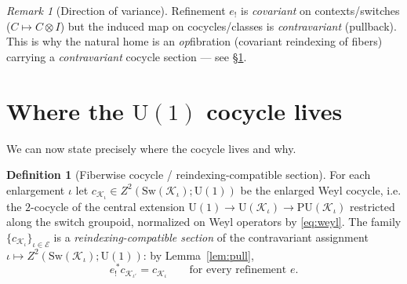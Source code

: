 \documentclass[11pt]{article}
\theoremstyle{definition}
\newtheorem{definition}{Definition}
\theoremstyle{remark}
\newtheorem*{remark}{Remark}
\newcommand{\K}{\mathcal K}
\newcommand{\Ecat}{\mathcal E}
\newcommand{\Sw}{\mathrm{Sw}}
\newcommand{\U}{\mathrm{U}}
\newcommand{\PU}{\mathrm{PU}}
\newcommand{\pushf}[1]{{#1}_{!}}
\begin{document}
\begin{remark}[Direction of variance]
Refinement $\pushf e$ is \emph{covariant} on contexts/switches ($C\mapsto C\otimes I$)
but the induced map on cocycles/classes is \emph{contravariant} (pullback). This is why
the natural home is an \emph{op}fibration (covariant reindexing of fibers) carrying a
\emph{contravariant} cocycle section --- see \S\ref{sec:cocycle}.
\end{remark}

\section{Where the \texorpdfstring{$\U(1)$}{U(1)} cocycle lives}\label{sec:cocycle}

We can now state precisely where the cocycle lives and why.

\begin{definition}[Fiberwise cocycle / reindexing-compatible section]\label{def:cocycle}
For each enlargement $\iota$ let $c_{\K_\iota}\in Z^2(\Sw(\K_\iota);\U(1))$ be the
enlarged Weyl cocycle, i.e. the $2$-cocycle of the central extension
$\U(1)\to\U(\K_\iota)\to\PU(\K_\iota)$ restricted along the switch groupoid, normalized
on Weyl operators by \eqref{eq:weyl}. The family
$\{c_{\K_\iota}\}_{\iota\in\Ecat}$ is a \emph{reindexing-compatible section} of the
contravariant assignment $\iota\mapsto Z^2(\Sw(\K_\iota);\U(1))$: by
Lemma~\ref{lem:pull},
\begin{equation}\label{eq:section}
\pushf e^{\,\ast}c_{\K_{\iota'}}=c_{\K_\iota}\qquad\text{for every refinement } e.
\end{equation}
\end{definition}
\end{document}
